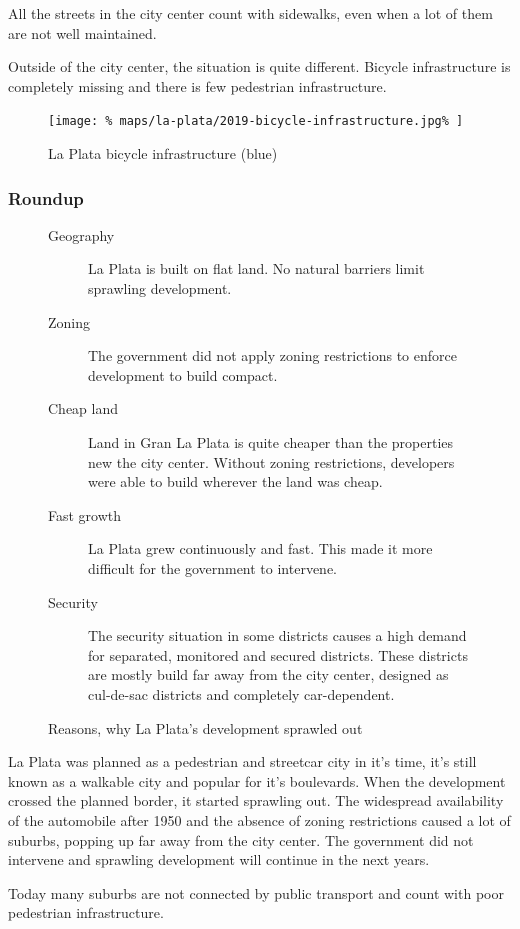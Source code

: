 \documentclass{article}
\begin{document}
\begin{multicols}{2}
			All the streets in the city center count with sidewalks, even when a lot of them are not well maintained.
			
			Outside of the city center, the situation is quite different. Bicycle infrastructure is completely missing and there is few pedestrian infrastructure.
			
			\begin{figure}[H]
				\texttt{[image: \%
					maps/la-plata/2019-bicycle-infrastructure.jpg\%
				]}
				\caption{La Plata bicycle infrastructure (blue)  \cite{OpenCycleMap:LaPlata}}
				\label{fig:map:la-plata-bicycle-infrastructure}
			\end{figure}
			
			
			\subsubsection{Roundup}
			
			\begin{figure}[H]
				\begin{description}
					\item [Geography] La Plata is built on flat land. No natural barriers limit sprawling development.
					\item [Zoning] The government did not apply zoning restrictions to enforce development to build compact.
					\item [Cheap land] Land in Gran La Plata is quite cheaper than the properties new the city center. Without zoning restrictions, developers were able to build wherever the land was cheap.
					\item [Fast growth] La Plata grew continuously and fast. This made it more difficult for the government to intervene.
					\item [Security] The security situation in some districts causes a high demand for separated, monitored and secured districts. These districts are mostly build far away from the city center, designed as cul-de-sac districts and completely car-dependent.
				\end{description}
				\caption{Reasons, why La Plata's development sprawled out}
				\label{fig:list:la-plata-development-reasons}
			\end{figure}
			
			La Plata was planned as a pedestrian and streetcar city in it's time, it's still known as a walkable city and popular for it's boulevards.
			When the development crossed the planned border, it started sprawling out. The widespread availability of the automobile after 1950 and the absence of zoning restrictions caused a lot of suburbs, popping up far away from the city center. The government did not intervene and sprawling development will continue in the next years. 
			
			Today many suburbs are not connected by public transport and count with poor pedestrian infrastructure.
			
		\end{multicols}
			
\end{document}
